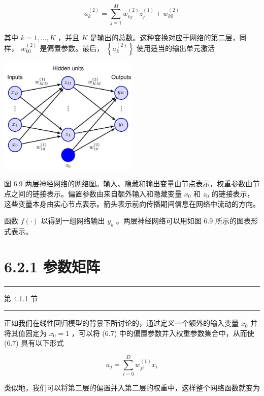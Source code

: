 \documentclass[10pt]{report}
\newcommand{\HRule}{\begin{center}\rule{0.9\linewidth}{0.2mm}\end{center}}
\begin{document}
\[
{a}_{k}^{\left( 2\right) } = \mathop{\sum }\limits_{{j = 1}}^{M}{w}_{kj}^{\left( 2\right) }{z}_{j}^{\left( 1\right) } + {w}_{k0}^{\left( 2\right) } \tag{6.9}
\]

其中 \(k = 1,\ldots ,K\) ，并且 \(K\) 是输出的总数。这种变换对应于网络的第二层，同样， \({w}_{k0}^{\left( 2\right) }\) 是偏置参数。最后， \(\left\{  {a}_{k}^{\left( 2\right) }\right\}\) 使用适当的输出单元激活

\begin{center}
\includegraphics[max width=0.5\textwidth]{images/0194e279-9b28-703a-88f4-c3ac21e2010d_200_921_351_618_515_0.jpg}
\end{center}
\hspace*{3em} 

图 6.9 两层神经网络的网络图。输入、隐藏和输出变量由节点表示，权重参数由节点之间的链接表示。偏置参数由来自额外输入和隐藏变量 \({x}_{0}\) 和 \({z}_{0}\) 的链接表示，这些变量本身由实心节点表示。箭头表示前向传播期间信息在网络中流动的方向。

函数 \(f\left( \cdot \right)\) 以得到一组网络输出 \({y}_{k}\) 。两层神经网络可以用如图 6.9 所示的图表形式表示。

\section*{6.2.1 参数矩阵}

\HRule

第 4.1.1 节

\HRule

正如我们在线性回归模型的背景下所讨论的，通过定义一个额外的输入变量 \({x}_{0}\) 并将其值固定为 \({x}_{0} = 1\) ，可以将 (6.7) 中的偏置参数并入权重参数集合中，从而使 (6.7) 具有以下形式

\[
{a}_{j} = \mathop{\sum }\limits_{{i = 0}}^{D}{w}_{ji}^{\left( 1\right) }{x}_{i} \tag{6.10}
\]

类似地，我们可以将第二层的偏置并入第二层的权重中，这样整个网络函数就变为
\end{document}
